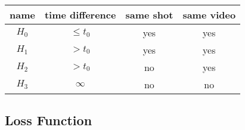 \documentclass{article}
\renewenvironment{table}{\par\medskip\noindent\minipage{\linewidth}}{\endminipage\par\medskip}
\begin{document}
\begin{multicols}{2}
\begin{table}
\begin{small}\begin{sc}\begin{center}
\begin{tabular}{cccc}
\hline
name & time difference & same shot & same video \\ \hline
$H_0$ & $\le t_0$ & yes & yes \\
$H_1$ & $>t_0$ & yes & yes \\
$H_2$ & $>t_0$ & no & yes \\
$H_3$ & $\infty$ & no & no \\ \hline
\end{tabular}\end{center}
\end{sc}
\end{small}
\label{hierarchy}
\end{table}


\subsection{Loss Function}


\end{multicols}
\end{document}
